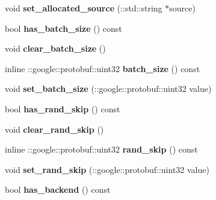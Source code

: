 \begin{DoxyCompactItemize}
void {\bfseries set\+\_\+allocated\+\_\+source} (\+::std\+::string $\ast$source)
\item 
\mbox{\label{classcaffe_1_1_data_parameter_a3e098f160d38ceb8b8d8b659baac4307}} 
bool {\bfseries has\+\_\+batch\+\_\+size} () const
\item 
\mbox{\label{classcaffe_1_1_data_parameter_ab71ac84e7230d5695e278a7b5fce45cf}} 
void {\bfseries clear\+\_\+batch\+\_\+size} ()
\item 
\mbox{\label{classcaffe_1_1_data_parameter_a752298dedc21772deed91d52cf3a37b2}} 
inline \+::google\+::protobuf\+::uint32 {\bfseries batch\+\_\+size} () const
\item 
\mbox{\label{classcaffe_1_1_data_parameter_a71daeddbe2891937522010d289036468}} 
void {\bfseries set\+\_\+batch\+\_\+size} (\+::google\+::protobuf\+::uint32 value)
\item 
\mbox{\label{classcaffe_1_1_data_parameter_a3965cfa9cf11c1d495f90f8dd68615c6}} 
bool {\bfseries has\+\_\+rand\+\_\+skip} () const
\item 
\mbox{\label{classcaffe_1_1_data_parameter_a883298dcc281455776f73bb809e6df6d}} 
void {\bfseries clear\+\_\+rand\+\_\+skip} ()
\item 
\mbox{\label{classcaffe_1_1_data_parameter_a2c05002a71d420119968377e4a666113}} 
inline \+::google\+::protobuf\+::uint32 {\bfseries rand\+\_\+skip} () const
\item 
\mbox{\label{classcaffe_1_1_data_parameter_a724edf3fdf8e348f733f5742c8a7e9a6}} 
void {\bfseries set\+\_\+rand\+\_\+skip} (\+::google\+::protobuf\+::uint32 value)
\item 
\mbox{\label{classcaffe_1_1_data_parameter_a69080bd627668faaf59082b57a7b0bc8}} 
bool {\bfseries has\+\_\+backend} () const
\item 
\mbox{\label{classcaffe_1_1_data_parameter_ae38f76f6683a557aeb69ca05ceb5d110}} 

\end{DoxyCompactItemize}

